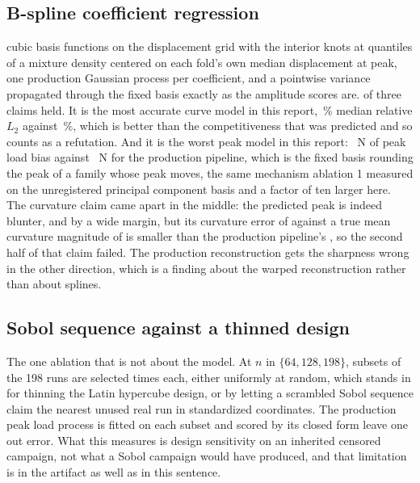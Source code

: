 \documentclass[11pt,a4paper]{article}
\begin{document}
\subsection{B-spline coefficient regression}
\AblationFourBasisFunctions{} cubic basis functions on the displacement grid with the interior
knots at quantiles of a mixture density centered on each fold's own median displacement at peak,
one production Gaussian process per coefficient, and a pointwise variance propagated through the
fixed basis exactly as the amplitude scores are. \AblationFourClaimsHeld{} of three claims held.
It is the most accurate curve model in this report, \AblationFourForceLTwo\,\% median relative
$L_2$ against \CurveLTwoGP\,\%, which is better than the competitiveness that was predicted and
so counts as a refutation. And it is the worst peak model in this report:
\AblationFourPeakBias~N of peak load bias against \AblationFourProductionPeakBias~N for the
production pipeline, which is the fixed basis rounding the peak of a family whose peak moves,
the same mechanism ablation 1 measured on the unregistered principal component basis and a factor
of ten larger here. The curvature claim came apart in the middle: the predicted peak is indeed
blunter, and by a wide margin, but its curvature error of \AblationFourCurvatureError{} against a
true mean curvature magnitude of \AblationFourTruthCurvature{} is smaller than the production
pipeline's \AblationFourProductionCurvatureError{}, so the second half of that claim failed. The
production reconstruction gets the sharpness wrong in the other direction, which is a finding
about the warped reconstruction rather than about splines.

\subsection{Sobol sequence against a thinned design}
The one ablation that is not about the model. At $n$ in $\{64, 128, 198\}$, subsets of the 198
runs are selected \AblationFiveRepetitions{} times each, either uniformly at random, which stands
in for thinning the Latin hypercube design, or by letting a scrambled Sobol sequence claim the
nearest unused real run in standardized coordinates. The production peak load process is fitted
on each subset and scored by its closed form leave one out error. What this measures is design
sensitivity on an inherited censored campaign, not what a Sobol campaign would have produced, and
that limitation is in the artifact as well as in this sentence.
\end{document}
